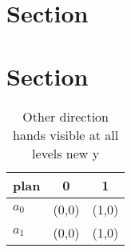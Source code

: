 \documentclass[a4paper]{article}
\begin{document}
\section{Section}

\section{Section}

\begin{table}
\begin{adjustbox}{width=0.7\columnwidth}
\begin{tabular}{|l|l|l|}
\hline
\textbf{plan} & \multicolumn{1}{c|}{\textbf{0}} & \multicolumn{1}{c|}{\textbf{1}} \\ \hline
\textbf{$a_0$}  & (0,0) & (1,0) \\ \hline
\textbf{$a_1$}  & (0,0) & (1,0) \\ \hline
\end{tabular}
\end{adjustbox}
\caption{Other direction hands visible at all levels new y
}
\end{table}
\end{document}
